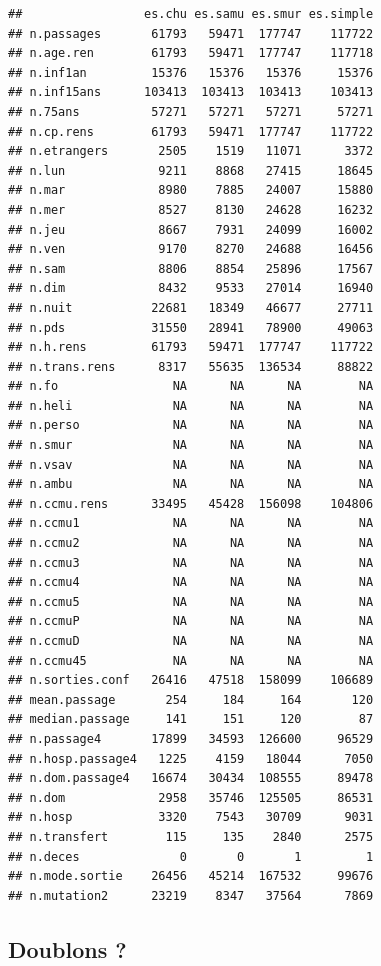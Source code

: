 \documentclass[]{article}
\begin{document}
\begin{verbatim}
##                 es.chu es.samu es.smur es.simple
## n.passages       61793   59471  177747    117722
## n.age.ren        61793   59471  177747    117718
## n.inf1an         15376   15376   15376     15376
## n.inf15ans      103413  103413  103413    103413
## n.75ans          57271   57271   57271     57271
## n.cp.rens        61793   59471  177747    117722
## n.etrangers       2505    1519   11071      3372
## n.lun             9211    8868   27415     18645
## n.mar             8980    7885   24007     15880
## n.mer             8527    8130   24628     16232
## n.jeu             8667    7931   24099     16002
## n.ven             9170    8270   24688     16456
## n.sam             8806    8854   25896     17567
## n.dim             8432    9533   27014     16940
## n.nuit           22681   18349   46677     27711
## n.pds            31550   28941   78900     49063
## n.h.rens         61793   59471  177747    117722
## n.trans.rens      8317   55635  136534     88822
## n.fo                NA      NA      NA        NA
## n.heli              NA      NA      NA        NA
## n.perso             NA      NA      NA        NA
## n.smur              NA      NA      NA        NA
## n.vsav              NA      NA      NA        NA
## n.ambu              NA      NA      NA        NA
## n.ccmu.rens      33495   45428  156098    104806
## n.ccmu1             NA      NA      NA        NA
## n.ccmu2             NA      NA      NA        NA
## n.ccmu3             NA      NA      NA        NA
## n.ccmu4             NA      NA      NA        NA
## n.ccmu5             NA      NA      NA        NA
## n.ccmuP             NA      NA      NA        NA
## n.ccmuD             NA      NA      NA        NA
## n.ccmu45            NA      NA      NA        NA
## n.sorties.conf   26416   47518  158099    106689
## mean.passage       254     184     164       120
## median.passage     141     151     120        87
## n.passage4       17899   34593  126600     96529
## n.hosp.passage4   1225    4159   18044      7050
## n.dom.passage4   16674   30434  108555     89478
## n.dom             2958   35746  125505     86531
## n.hosp            3320    7543   30709      9031
## n.transfert        115     135    2840      2575
## n.deces              0       0       1         1
## n.mode.sortie    26456   45214  167532     99676
## n.mutation2      23219    8347   37564      7869
\end{verbatim}

\subsection{Doublons ?}\label{doublons}
\end{document}
